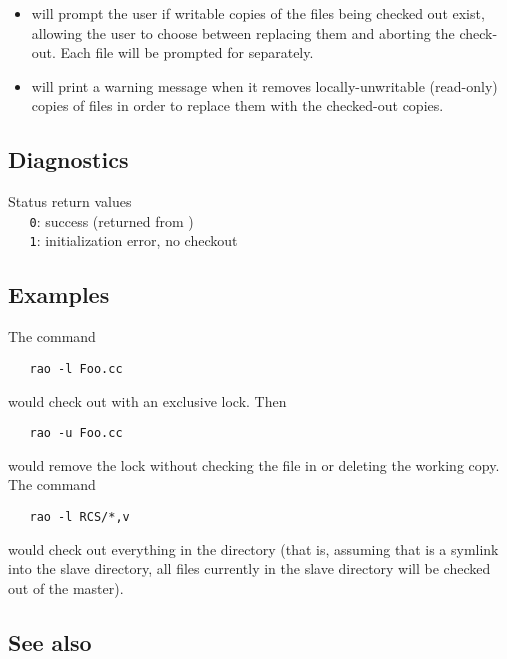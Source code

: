\begin{itemize}
\item
    will prompt the user if writable copies of the files being
   checked out exist, allowing the user to choose between replacing them
   and aborting the check-out.  Each file will be prompted for
   separately.

\item
    will print a warning message when it removes
   locally-unwritable (read-only) copies of files in order to replace
   them with the checked-out copies.
\end{itemize}
 
\subsection*{Diagnostics}
 
Status return values
\\ \verb+   0+:  success (returned from )
\\ \verb+   1+:  initialization error, no checkout

\subsection*{Examples}
 
The command
 
\begin{verbatim}
   rao -l Foo.cc
\end{verbatim}
 
\noindent
would check out  with an exclusive lock.  Then
 
\begin{verbatim}
   rao -u Foo.cc
\end{verbatim}
 
\noindent
would remove the lock without checking the file in or deleting the working
copy.  The command
 
\begin{verbatim}
   rao -l RCS/*,v
\end{verbatim}
 
\noindent
would check out everything in the directory (that is, assuming that 
is a symlink into the slave directory, all files currently in the slave
directory will be checked out of the master).

\subsection*{See also}
 

